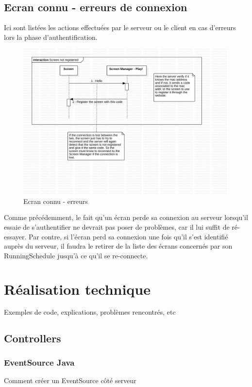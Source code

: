 \documentclass[french]{article}
\begin{document}
\subsection{Ecran connu - erreurs de connexion}
	Ici sont listées les actions effectuées par le serveur ou le client en cas d'erreurs lors la phase d'authentification.
	\begin{figure}[h!]
		\centering
		\includegraphics[page={2}, scale=0.5]{protocol_v2}
		\caption{Ecran connu - erreurs}
	\end{figure}
	
			
	Comme précédemment, le fait qu'un écran perde sa connexion au serveur lorsqu'il essaie de s'authentifier ne devrait pas poser de problèmes, car il lui suffit de ré-essayer. \newline
	Par contre, si l'écran perd sa connexion une fois qu'il s'est identifié auprès du serveur, il faudra le retirer de la liste des écrans concernés par son RunningSchedule jusqu'à ce qu'il se re-connecte. \newpage
	
	
\section{Réalisation technique}
Exemples de code, explications, problèmes rencontrés, etc

\subsection{Controllers}

\subsubsection{EventSource Java}
Comment créer un EventSource côté serveur
\end{document}
